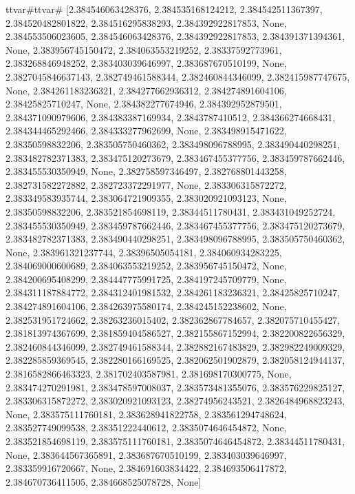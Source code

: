 \documentclass[
  11pt,
  french,
]{article}
\begin{document}
\begin{tcolorbox}[title= Répartition des volumes selon leurs caractéristiques ,colback=boitecode]
ttvar{#}ttvar{#} [2.384546063428376, 2.384535168124212, 2.384542511367397, 2.384520482801822, 2.384516295838293, 2.384392922817853, None, 2.384553506023605, 2.384546063428376, 2.384392922817853, 2.384391371394361, None, 2.383956745150472, 2.384063553219252, 2.38337592773961, 2.383268846948252, 2.383403039646997, 2.383687670510199, None, 2.3827045846637143, 2.382749461588344, 2.382460844346099, 2.382415987747675, None, 2.384261183236321, 2.384277662936312, 2.384274891604106, 2.38425825710247, None, 2.384382277674946, 2.384392952879501, 2.384371090979606, 2.384383387169934, 2.3843787410512, 2.384366274668431, 2.384344465292466, 2.384333277962699, None, 2.383498915471622, 2.38350598832206, 2.383505750460362, 2.383498096788995, 2.383490440298251, 2.383482782371383, 2.383475120273679, 2.383467455377756, 2.383459787662446, 2.383455530350949, None, 2.382758597346497, 2.382768801443258, 2.382731582272882, 2.382723372291977, None, 2.383306315872272, 2.383349583935744, 2.383064721909355, 2.383020921093123, None, 2.38350598832206, 2.383521854698119, 2.38344511780431, 2.383431049252724, 2.383455530350949, 2.383459787662446, 2.383467455377756, 2.383475120273679, 2.383482782371383, 2.383490440298251, 2.383498096788995, 2.383505750460362, None, 2.383961321237744, 2.38396505054181, 2.384060934283225, 2.384069000600689, 2.384063553219252, 2.383956745150472, None, 2.384200695408299, 2.384447775991725, 2.384197245709779, None, 2.384311187884772, 2.384312401981532, 2.384261183236321, 2.38425825710247, 2.384274891604106, 2.384263975580174, 2.384245152238602, None, 2.382531951724662, 2.38263236015402, 2.382362867784657, 2.382075710455427, 2.381813974367699, 2.381859404586527, 2.382155867152994, 2.382200822656329, 2.382460844346099, 2.382749461588344, 2.382882167483829, 2.382982249009329, 2.382285859369545, 2.382280166169525, 2.382062501902879, 2.382058124944137, 2.3816582866463323, 2.381702403587981, 2.381698170300775, None, 2.383474270291981, 2.383478597008037, 2.383573481355076, 2.383576229825127, 2.383306315872272, 2.383020921093123, 2.38274956243521, 2.3826484968823243, None, 2.383575111760181, 2.383628941822758, 2.383561294748624, 2.383527749099538, 2.38351222440612, 2.3835074646454872, None, 2.383521854698119, 2.383575111760181, 2.3835074646454872, 2.38344511780431, None, 2.383644567365891, 2.383687670510199, 2.383403039646997, 2.383359916720667, None, 2.384691603834422, 2.384693506417872, 2.384670736411505, 2.384668525078728, None]

\end{tcolorbox}
\end{document}
